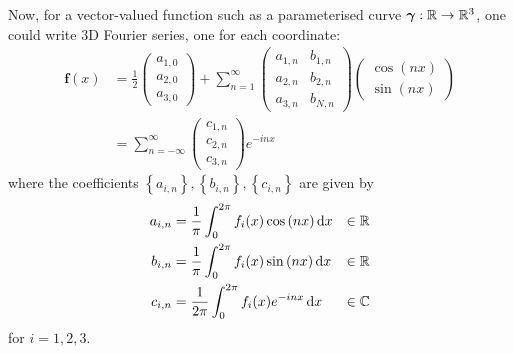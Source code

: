 \documentclass[../dissertation.tex]{subfiles}
\begin{document}
Now, for a vector-valued function such as a parameterised curve $\boldsymbol{\gamma}:\mathbb{R} \rightarrow \mathbb{R}^3$, one could write 3D Fourier series,
one for each coordinate:
\begin{align}
    \mathbf{f} (x) &= \frac{1}{2}
    \begin{pmatrix}
        a_{1,0} \\
        a_{2,0} \\
        a_{3,0}
    \end{pmatrix}
    + \sum_{n=1}^\infty
    \begin{pmatrix}
        a_{1,n} & b_{1,n} \\
        a_{2,n} & b_{2,n} \\
        a_{3,n} & b_{N,n}
    \end{pmatrix}
    \begin{pmatrix}
        \cos {\left( nx \right)} \\
        \sin {\left( nx \right)}
    \end{pmatrix}
    \\
    &= \sum_{n=-\infty}^{\infty}
    \begin{pmatrix}
        c_{1,n} \\
        c_{2,n} \\
        c_{3,n}
    \end{pmatrix}
    e^{-inx}
\end{align}
where the coefficients $\left\{ a_{i,n} \right\}, \left\{ b_{i,n} \right\}, \left\{ c_{i,n} \right\}$ are given by
\begin{align}
    a_{i,n} &= \frac{1}{\pi} \int_{0}^{2\pi} f_i (x) \cos {\left( nx \right)} \, \text{d} x & \in \mathbb{R}\\
    b_{i,n} &= \frac{1}{\pi} \int_{0}^{2\pi} f_i (x) \sin {\left( nx \right)} \, \text{d} x & \in \mathbb{R}\\
    c_{i,n} &= \frac{1}{2\pi} \int_{0}^{2\pi} f_i (x) e^{-inx} \, \text{d} x & \in \mathbb{C}
\end{align}
for $i=1, 2, 3$.
\end{document}

